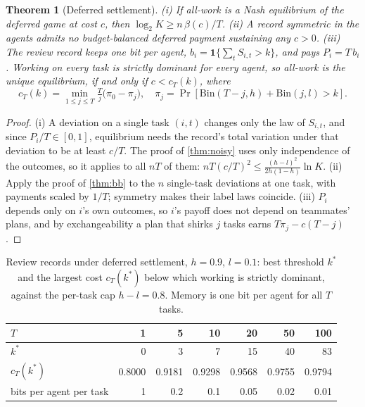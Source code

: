 \documentclass[sigconf,anonymous,acmthm=false]{aamas}
\theoremstyle{acmplain}
\newtheorem{theorem}{Theorem}
\theoremstyle{acmdefinition}
\begin{document}
\begin{theorem}[Deferred settlement]\label{thm:deferred}
(i) If all-work is a Nash equilibrium of the deferred game at cost $c$, then
$\log_2K\ge n\,\beta(c)/T$. (ii) A record symmetric in the agents admits no budget-balanced
deferred payment sustaining any $c>0$. (iii) The \emph{review record} keeps one bit per agent,
$b_i=\mathbf1\{\sum_tS_{i,t}>k\}$, and pays $P_i=T\,b_i$. Working on every task is strictly
dominant for every agent, so all-work is the unique equilibrium, if and only if $c<c_T(k)$,
where
\[ c_T(k)=\min_{1\le j\le T}\tfrac Tj\big(\pi_0-\pi_j\big),\quad
\pi_j=\Pr[\mathrm{Bin}(T{-}j,h)+\mathrm{Bin}(j,l)>k]. \]
\end{theorem}
\begin{proof}
(i) A deviation on a single task $(i,t)$ changes only the law of $S_{i,t}$, and since
$P_i/T\in[0,1]$, equilibrium needs the record's total variation under that deviation to be at
least $c/T$. The proof of \cref{thm:noisy} uses only independence of the outcomes, so it
applies to all $nT$ of them: $nT(c/T)^2\le\frac{(h-l)^2}{2h(1-h)}\ln K$. (ii) Apply the proof
of \cref{thm:bb} to the $n$ single-task deviations at one task, with payments scaled by
$1/T$; symmetry makes their label laws coincide. (iii) $P_i$ depends only on $i$'s own
outcomes, so $i$'s payoff does not depend on teammates' plans, and by exchangeability a plan
that shirks $j$ tasks earns $T\pi_j-c(T-j)$.
\end{proof}

\begin{table}[t]
\caption{Review records under deferred settlement, $h=0.9$, $l=0.1$: best threshold $k^*$ and
the largest cost $c_T(k^*)$ below which working is strictly dominant, against the per-task cap
$h-l=0.8$. Memory is one bit per agent for all $T$ tasks.}
\label{tab:review}
\footnotesize
\begin{tabular}{@{}lrrrrrr@{}}
\toprule
$T$ & 1 & 5 & 10 & 20 & 50 & 100\\
\midrule
$k^*$ & 0 & 3 & 7 & 15 & 40 & 83\\
$c_T(k^*)$ & 0.8000 & 0.9181 & 0.9298 & 0.9568 & 0.9755 & 0.9794\\
bits per agent per task & 1 & 0.2 & 0.1 & 0.05 & 0.02 & 0.01\\
\bottomrule
\end{tabular}
\end{table}
\end{document}
